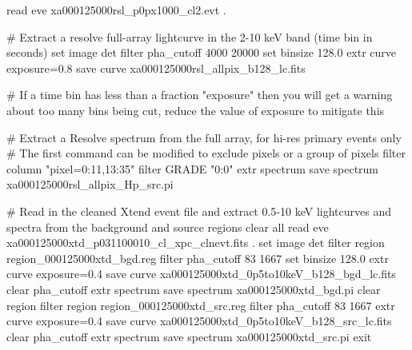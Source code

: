 \documentclass[
  letterpaper,
  DIV=11,
  numbers=noendperiod]{scrreprt}
\newenvironment{Shaded}{\begin{snugshade}}{\end{snugshade}}
\newcommand{\BuiltInTok}[1]{\textcolor[rgb]{0.00,0.23,0.31}{#1}}
\newcommand{\CommentTok}[1]{\textcolor[rgb]{0.37,0.37,0.37}{#1}}
\newcommand{\ExtensionTok}[1]{\textcolor[rgb]{0.00,0.23,0.31}{#1}}
\newcommand{\FunctionTok}[1]{\textcolor[rgb]{0.28,0.35,0.67}{#1}}
\newcommand{\NormalTok}[1]{\textcolor[rgb]{0.00,0.23,0.31}{#1}}
\newcommand{\StringTok}[1]{\textcolor[rgb]{0.13,0.47,0.30}{#1}}
\newcommand{\VariableTok}[1]{\textcolor[rgb]{0.07,0.07,0.07}{#1}}
\begin{document}
\begin{Shaded}
\begin{Highlighting}[]
\BuiltInTok{read} \VariableTok{eve} \VariableTok{xa000125000rsl\_p0px1000\_cl2}\NormalTok{.evt .}

\CommentTok{\# Extract a resolve full{-}array lightcurve in the 2{-}10 keV band (time bin in seconds)}
\BuiltInTok{set}\NormalTok{ image det}
\ExtensionTok{filter}\NormalTok{ pha\_cutoff 4000 20000}
\BuiltInTok{set}\NormalTok{ binsize 128.0}
\ExtensionTok{extr}\NormalTok{ curve exposure=0.8}
\ExtensionTok{save}\NormalTok{ curve xa000125000rsl\_allpix\_b128\_lc.fits}

\CommentTok{\# If a time bin has less than a fraction "exposure" then you will get a warning about too many bins being cut, reduce the value of exposure to mitigate this}

\CommentTok{\# Extract a Resolve spectrum from the full array, for hi{-}res primary events only}
\CommentTok{\# The first command can be modified to exclude pixels or a group of pixels}
\ExtensionTok{filter}\NormalTok{ column }\StringTok{"pixel=0:11,13:35"}
\ExtensionTok{filter}\NormalTok{ GRADE }\StringTok{"0:0"}
\ExtensionTok{extr}\NormalTok{ spectrum}
\ExtensionTok{save}\NormalTok{ spectrum xa000125000rsl\_allpix\_Hp\_src.pi}

\CommentTok{\# Read in the cleaned Xtend event file and extract 0.5{-}10 keV lightcurves and spectra from the background and source regions}
\FunctionTok{clear}\NormalTok{ all}
\BuiltInTok{read} \VariableTok{eve} \VariableTok{xa000125000xtd\_p031100010\_cl\_xpc\_clnevt}\NormalTok{.fits .}
\BuiltInTok{set}\NormalTok{ image det}
\ExtensionTok{filter}\NormalTok{ region region\_000125000xtd\_bgd.reg}
\ExtensionTok{filter}\NormalTok{ pha\_cutoff 83 1667}
\BuiltInTok{set}\NormalTok{ binsize 128.0}
\ExtensionTok{extr}\NormalTok{ curve exposure=0.4}
\ExtensionTok{save}\NormalTok{ curve xa000125000xtd\_0p5to10keV\_b128\_bgd\_lc.fits}
\FunctionTok{clear}\NormalTok{ pha\_cutoff}
\ExtensionTok{extr}\NormalTok{ spectrum}
\ExtensionTok{save}\NormalTok{ spectrum xa000125000xtd\_bgd.pi}
\FunctionTok{clear}\NormalTok{ region}
\ExtensionTok{filter}\NormalTok{ region region\_000125000xtd\_src.reg}
\ExtensionTok{filter}\NormalTok{ pha\_cutoff 83 1667}
\ExtensionTok{extr}\NormalTok{ curve exposure=0.4}
\ExtensionTok{save}\NormalTok{ curve xa000125000xtd\_0p5to10keV\_b128\_src\_lc.fits}
\FunctionTok{clear}\NormalTok{ pha\_cutoff}
\ExtensionTok{extr}\NormalTok{ spectrum}
\ExtensionTok{save}\NormalTok{ spectrum xa000125000xtd\_src.pi}
\BuiltInTok{exit}
\end{Highlighting}
\end{Shaded}
\end{document}

